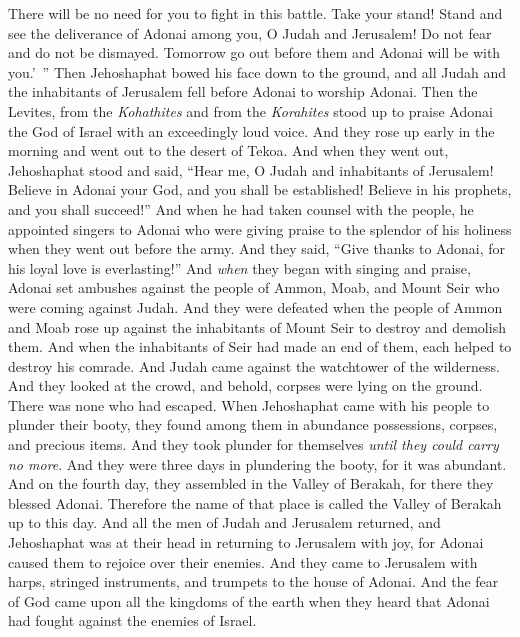 \begin{biblechapter}
\verse There will be no need for you to fight in this battle. Take your stand! Stand and see the deliverance of Adonai among you, O Judah and Jerusalem! Do not fear and do not be dismayed. Tomorrow go out before them and Adonai will be with you.’ ”
\verse Then Jehoshaphat bowed his face down to the ground, and all Judah and the inhabitants of Jerusalem fell before Adonai to worship Adonai.
\verse Then the Levites, from the \textit{Kohathites} and from the \textit{Korahites} stood up to praise Adonai the God of Israel with an exceedingly loud voice.
 And they rose up early in the morning and went out to the desert of Tekoa. And when they went out, Jehoshaphat stood and said, “Hear me, O Judah and inhabitants of Jerusalem! Believe in Adonai your God, and you shall be established! Believe in his prophets, and you shall succeed!”
\verse And when he had taken counsel with the people, he appointed singers to Adonai who were giving praise to the splendor of his holiness when they went out before the army. And they said, “Give thanks to Adonai, for his loyal love is everlasting!”
\verse And \textit{when} they began with singing and praise, Adonai set ambushes against the people of Ammon, Moab, and Mount Seir who were coming against Judah. And they were defeated
\verse when the people of Ammon and Moab rose up against the inhabitants of Mount Seir to destroy and demolish them. And when the inhabitants of Seir had made an end of them, each helped to destroy his comrade.
\verse And Judah came against the watchtower of the wilderness. And they looked at the crowd, and behold, corpses were lying on the ground. There was none who had escaped.
\verse When Jehoshaphat came with his people to plunder their booty, they found among them in abundance possessions, corpses, and precious items. And they took plunder for themselves \textit{until they could carry no more}. And they were three days in plundering the booty, for it was abundant.
\verse And on the fourth day, they assembled in the Valley of Berakah, for there they blessed Adonai. Therefore the name of that place is called the Valley of Berakah up to this day.
\verse And all the men of Judah and Jerusalem returned, and Jehoshaphat was at their head in returning to Jerusalem with joy, for Adonai caused them to rejoice over their enemies.
\verse And they came to Jerusalem with harps, stringed instruments, and trumpets to the house of Adonai.
\verse And the fear of God came upon all the kingdoms of the earth when they heard that Adonai had fought against the enemies of Israel.

\end{biblechapter}
